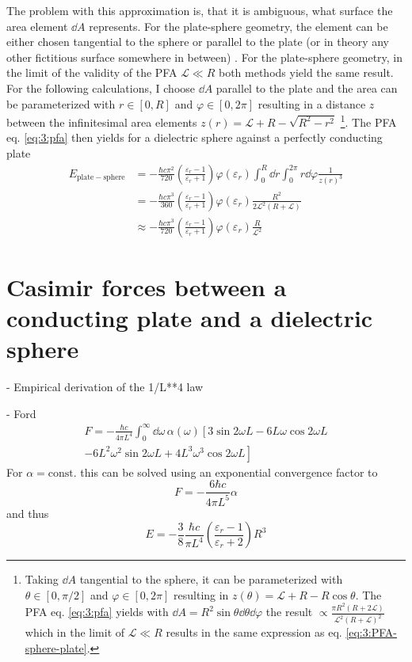 The problem with this approximation is, that it is ambiguous, what surface the area element $\dd A$ represents. For the plate-sphere geometry, the element can be either chosen tangential to the sphere or parallel to the plate (or in theory any other fictitious surface somewhere in between) \cite{Bulgac_2006}.
For the plate-sphere geometry, in the limit of the validity of the PFA $\mathscr{L} \ll R$ both methods yield the same result.
For the following calculations, I choose $\dd A$ parallel to the plate and the area can be parameterized with $r\in [0, R]$ and $\varphi \in [0, 2\pi]$ resulting in a distance $z$ between the infinitesimal area elements $z(r) = \mathscr{L} + R - \sqrt{R^2 - r^2}$ \footnote{Taking $\dd A$ tangential to the sphere, it can be parameterized with $\theta \in [0, \pi/2]$ and $\varphi \in [0, 2\pi]$ resulting in $z(\theta) = \mathscr{L} + R - R\cos\theta$. The PFA eq. \eqref{eq:3:pfa} yields with $\dd A = R^2\sin\theta\dd\theta\dd\varphi$ the result $\propto \frac{\pi R^2(R + 2\mathscr{L})}{\mathscr{L}^2(R+\mathscr{L})^2}$ which in the limit of $\mathscr{L} \ll R$ results in the same expression as eq. \eqref{eq:3:PFA-sphere-plate}.}. The PFA eq. \eqref{eq:3:pfa} then yields for a dielectric sphere against a perfectly conducting plate
\begin{align}
  E_\mathrm{plate-sphere} &= -\frac{\hbar c \pi^2}{720} \left(\frac{\varepsilon_r - 1}{\varepsilon_r + 1}\right) \varphi(\varepsilon_r) \int_0^R \dd r \int_0^{2\pi} r\dd \varphi \frac{1}{z(r)^3} \\
  &= -\frac{\hbar c \pi^3}{360} \left(\frac{\varepsilon_r - 1}{\varepsilon_r + 1}\right) \varphi(\varepsilon_r) \frac{R^2}{2\mathscr{L}^2(R + \mathscr{L})} \\
  &\approx -\frac{\hbar c \pi^3}{720} \left(\frac{\varepsilon_r - 1}{\varepsilon_r + 1}\right) \varphi(\varepsilon_r) \frac{R}{\mathscr{L}^2} \label{eq:3:PFA-sphere-plate}
\end{align}




\section{Casimir forces between a conducting plate and a dielectric sphere}
\label{sec:3:casimir-plate-sphere}

- Empirical derivation of the 1/L**4 law

- Ford \cite{Ford_1998}
\begin{multline}
  F = - \frac{\hbar c}{4 \pi L^4} \int_{0}^{\infty} \dd \omega \, \alpha(\omega) \left[3\sin 2 \omega L - 6L\omega \cos 2 \omega L \right. \\ 
  \left. - 6L^2\omega^2 \sin 2 \omega L + 4L^3\omega^3 \cos 2 \omega L\right]
\end{multline}
For $\alpha=\mathrm{const.}$ this can be solved using an exponential convergence factor to
\begin{equation}
  F = -\frac{6 \hbar c}{4 \pi L^5} \alpha
\end{equation}
and thus 
\begin{equation}
  E = -\frac{3}{8}\frac{\hbar c}{\pi L^4} \left(\frac{\varepsilon_r - 1}{\varepsilon_r + 2}\right)R^3
\end{equation}

